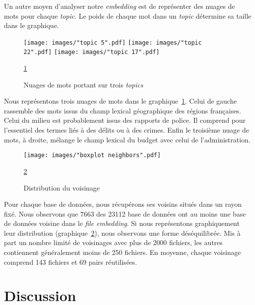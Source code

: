 \documentclass[a4paper]{article}
\begin{document}
	Un autre moyen d'analyser notre \emph{embedding} est de représenter des nuages de mots pour chaque \emph{topic}. Le poids de chaque mot dans un \emph{topic} détermine sa taille dans le graphique. 
	
	\begin{figure}[]
		\texttt{[image: images/"topic 5".pdf]}
		\label{fig:wc-region}
		\endminipage\hfill
		\texttt{[image: images/"topic 22".pdf]}
		\label{fig:wc-police}
		\endminipage\hfill
		\texttt{[image: images/"topic 17".pdf]}
		\label{fig:wc-budget}
		\endminipage
		\caption{Nuages de mots portant sur trois \emph{topics} }
		\label{fig:wc}
		\ref{fig:wc}
	\end{figure}
	
	Nous représentons trois nuages de mots dans le graphique~\ref{fig:wc}. Celui de gauche rassemble des mots issus du champ lexical géographique des régions françaises. Celui du milieu est probablement issus des rapports de police. Il comprend pour l'essentiel des termes liés à des délits ou à des crimes. Enfin le troisième nuage de mots, à droite, mélange le champ lexical du budget avec celui de l'administration.
	
	\begin{figure}[]
		\texttt{[image: images/"boxplot neighbors".pdf]}
		\caption{Distribution du voisinage}
		\label{fig:neighbors}
		\ref{fig:neighbors}
	\end{figure}
	
	Pour chaque base de données, nous récupérons ses voisins situés dans un rayon fixé. Nous observons que 7663 des 23112 base de données ont au moins une base de données voisine dans le \emph{file embedding}. Si nous représentons graphiquement leur distribution (graphique~\ref{fig:neighbors}), nous observons une forme déséquilibrée. Mis à part un nombre limité de voisinages avec plus de 2000 fichiers, les autres contiennent généralement moins de 250 fichiers. En moyenne, chaque voisinage comprend 143 fichiers et 69 pairs réutilisées.
	
	\section{Discussion}
	
\end{document}
